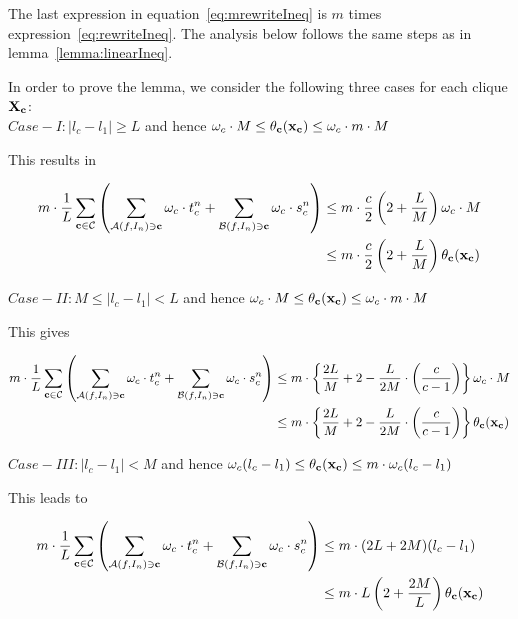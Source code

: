 \documentclass[10pt,letterpaper]{article}
\begin{document}
The last expression in equation~\ref{eq:mrewriteIneq} is $m$ times expression~\ref{eq:rewriteIneq}. The analysis below follows the same steps as in lemma~\ref{lemma:linearIneq}.

In order to prove the lemma, we consider the following three cases for each clique ${\bf X_c}$: \\

$Case - I: |l_c - l_1| \geq L$ and hence $ \omega_c \cdot M \leq \theta_{\bf c}({\bf{x_c}}) \leq \omega_c \cdot m \cdot M$

This results in 

\begin{align}
m \cdot \frac{1}{L}\sum_{{\bf c} \in \mathcal{C}}\left(\sum_{\mathcal{A}\mathit(f, I_n) \ni {\bf c}} {\bf \omega}_{c} \cdot t_c^n + \sum_{\mathcal{B} \mathit(f, I_n) \ni {\bf c}} {\bf \omega}_{c} \cdot s_c^n \right) &\leq m \cdot \frac{c}{2} \left( 2 + \frac{L}{M} \right) \omega_c \cdot M \nonumber \\
& \leq m \cdot \frac{c}{2} \left( 2 + \frac{L}{M} \right) \theta_{\bf c}({\bf{x_c}})
\label{eq:mcase1bound}
\end{align}

$Case - II: M \leq |l_c - l_1| < L$ and hence $ \omega_c \cdot M \leq \theta_{\bf c}({\bf{x_c}}) \leq \omega_c \cdot m \cdot M$

This gives

\begin{align}
m \cdot \frac{1}{L}\sum_{{\bf c} \in \mathcal{C}}\left(\sum_{\mathcal{A}\mathit(f, I_n) \ni {\bf c}} {\bf \omega}_{c} \cdot t_c^n + \sum_{\mathcal{B} \mathit(f, I_n) \ni {\bf c}} {\bf \omega}_{c} \cdot s_c^n \right) &\leq
m \cdot \left\{\frac{2L}{M} + 2 - \frac{L}{2M} \cdot \left( \frac{c}{c - 1} \right) \right\} \omega_c \cdot M \nonumber \\
& \leq m \cdot \left\{\frac{2L}{M} + 2 - \frac{L}{2M} \cdot \left( \frac{c}{c - 1} \right) \right\}  \theta_{\bf c}({\bf{x_c}})
\label{eq:mcase2bound}
\end{align}

$Case - III: |l_c - l_1| < M$ and hence $\omega_c(l_c - l_1) \leq \theta_{\bf c}({\bf{x_c}}) \leq m \cdot \omega_c(l_c - l_1)$

This leads to 

\begin{align}
m \cdot \frac{1}{L}\sum_{{\bf c} \in \mathcal{C}}\left(\sum_{\mathcal{A}\mathit(f, I_n) \ni {\bf c}} {\bf \omega}_{c} \cdot t_c^n + \sum_{\mathcal{B} \mathit(f, I_n) \ni {\bf c}} {\bf \omega}_{c} \cdot s_c^n \right) &\leq m \cdot (2L + 2M)(l_{c} - l_{1}) \nonumber\\
		  & \leq m \cdot  L\left(2 + \frac{2M}{L}\right) \theta_{\bf c}(\bf{x_c})
\label{eq:mcase3bound}
\end{align}
\end{document}
